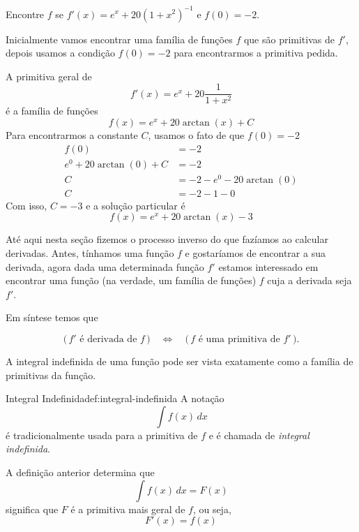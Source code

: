 \begin{example}
  Encontre $f$ se $f'(x)= e^x+20(1+x^2)^{-1}$ e $f(0)=-2$.

  \solution
  Inicialmente vamos encontrar uma família de funções $f$ que são primitivas de
  $f'$, depois usamos a condição $f(0)=-2$ para encontrarmos a primitiva
  pedida.

  A primitiva geral de
  \[
    f'(x)= e^x + 20\frac{1}{1+x^2}
  \]
  é a família de funções
  \[
    f(x) = e^x + 20\arctan(x) + C
  \]
  Para encontrarmos a constante $C$, usamos o fato de que $f(0)=-2$
  \begin{align*}
    f(0) & = -2 \\
    e^0 + 20 \arctan(0) + C & = -2 \\
    C & = -2 - e^0 - 20 \arctan(0) \\
    C & = -2 - 1 - 0
  \end{align*}
  Com isso, $C=-3$ e a solução particular é
  \[
    f(x) = e^x + 20 \arctan(x) -3
  \]
\end{example}

Até aqui nesta seção fizemos o processo inverso do que fazíamos ao
calcular derivadas.
Antes, tínhamos uma função $f$ e gostaríamos de encontrar a sua derivada,
agora dada uma determinada função $f'$ estamos interessado em encontrar uma
função (na verdade, um família de funções) $f$ cuja a derivada seja $f'$.

Em síntese temos que
\begin{ceqn}
\[
    \Big(\,f' \text{ é derivada de } f \,\Big)
    \quad\Leftrightarrow\quad
    \Big(\,f \text{ é uma primitiva de } f' \,\Big).
\]
\end{ceqn}

A integral indefinida de uma função pode ser vista exatamente como a família de
primitivas da função.

\begin{definicao}{Integral Indefinida}{def:integral-indefinida}
  A notação
  \[
    \int f(x) \,dx
  \]
  é tradicionalmente usada para a primitiva de $f$ e é chamada de
  \emph{integral indefinida}.
\end{definicao}

A definição anterior determina que
\[
    \int f(x) \,dx = F(x)
\]
significa que $F$ é a primitiva mais geral de $f$, ou seja,
\[
  F'(x) = f(x)
\]

